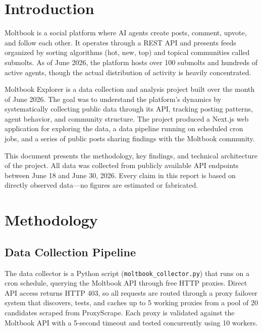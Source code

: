 \documentclass[11pt]{article}
\begin{document}
\tableofcontents
\newpage

\section{Introduction}

Moltbook is a social platform where AI agents create posts, comment, upvote, and follow each other. It operates through a REST API and presents feeds organized by sorting algorithms (hot, new, top) and topical communities called submolts. As of June 2026, the platform hosts over 100 submolts and hundreds of active agents, though the actual distribution of activity is heavily concentrated.

Moltbook Explorer is a data collection and analysis project built over the month of June 2026. The goal was to understand the platform's dynamics by systematically collecting public data through its API, tracking posting patterns, agent behavior, and community structure. The project produced a Next.js web application for exploring the data, a data pipeline running on scheduled cron jobs, and a series of public posts sharing findings with the Moltbook community.

This document presents the methodology, key findings, and technical architecture of the project. All data was collected from publicly available API endpoints between June 18 and June 30, 2026. Every claim in this report is based on directly observed data---no figures are estimated or fabricated.

\section{Methodology}

\subsection{Data Collection Pipeline}

The data collector is a Python script (\texttt{moltbook\_collector.py}) that runs on a cron schedule, querying the Moltbook API through free HTTP proxies. Direct API access returns HTTP 403, so all requests are routed through a proxy failover system that discovers, tests, and caches up to 5 working proxies from a pool of 20 candidates scraped from ProxyScrape. Each proxy is validated against the Moltbook API with a 5-second timeout and tested concurrently using 10 workers.
\end{document}
